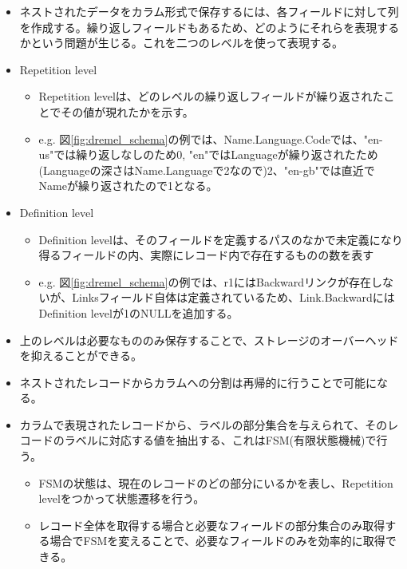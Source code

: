 \documentclass[dvipdfmx,uplatex]{jsarticle}
\theoremstyle{remark}
\newenvironment{method}[1]{
    \begin{tcolorbox}[
        colframe=green!50!black,
        colback=green!50!black!10!white,
        colbacktitle=green!50!black!40!white,
        coltitle=black,
        fonttitle=\bfseries,
        title={#1}
    ]
}{
    \end{tcolorbox}
}
\begin{document}
\begin{method}{ネスト型カラムストレージ}
\begin{itemize}
    \item ネストされたデータをカラム形式で保存するには、各フィールドに対して列を作成する。繰り返しフィールドもあるため、どのようにそれらを表現するかという問題が生じる。これを二つのレベルを使って表現する。
    \item Repetition level
    \begin{itemize}
        \item Repetition levelは、どのレベルの繰り返しフィールドが繰り返されたことでその値が現れたかを示す。
        \item e.g. 図\ref{fig:dremel_schema}の例では、Name.Language.Codeでは、"en-us"では繰り返しなしのため0, "en"ではLanguageが繰り返されたため(Languageの深さはName.Languageで2なので)2、"en-gb"では直近でNameが繰り返されたので1となる。
    \end{itemize}
    \item Definition level
    \begin{itemize}
        \item Definition levelは、そのフィールドを定義するパスのなかで未定義になり得るフィールドの内、実際にレコード内で存在するものの数を表す
        \item e.g. 図\ref{fig:dremel_schema}の例では、r1にはBackwardリンクが存在しないが、Linksフィールド自体は定義されているため、Link.BackwardにはDefinition levelが1のNULLを追加する。
    \end{itemize}
    \item 上のレベルは必要なもののみ保存することで、ストレージのオーバーヘッドを抑えることができる。
    \item ネストされたレコードからカラムへの分割は再帰的に行うことで可能になる。
    \item カラムで表現されたレコードから、ラベルの部分集合を与えられて、そのレコードのラベルに対応する値を抽出する、これはFSM(有限状態機械)で行う。
    \begin{itemize}
        \item FSMの状態は、現在のレコードのどの部分にいるかを表し、Repetition levelをつかって状態遷移を行う。
        \item レコード全体を取得する場合と必要なフィールドの部分集合のみ取得する場合でFSMを変えることで、必要なフィールドのみを効率的に取得できる。
    \end{itemize}
\end{itemize}
\end{method}
\end{document}
